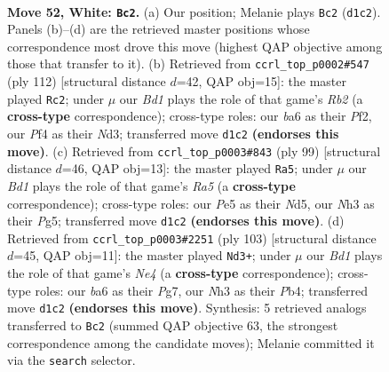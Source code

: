 \documentclass[11pt]{article}
\begin{document}
\clearpage

\begin{figure}[p]\centering
\begin{subfigure}{0.46\textwidth}\centering
\resizebox{\linewidth}{!}{%
\newchessgame
\chessboard[
  setfen={6k1/2r2p1p/b5p1/4Pp2/5P2/2n4N/P4KPP/3B4 w - - 12 52},
  showmover=false,
  pgfstyle=straightmove, color=movearrow, markmove={d1-c2}
]}
\caption{}
\end{subfigure}\hfill
\begin{subfigure}{0.46\textwidth}\centering
\resizebox{\linewidth}{!}{%
\newchessgame
\chessboard[
  setfen={8/2r1bpk1/4p1pp/8/2n4P/3NPBP1/1R3P1K/8 w - - 19 57},
  showmover=false,
  pgfstyle=straightmove, color=movearrow, markmove={b2-c2}
]}
\caption{}
\end{subfigure}
\\[4pt]
\begin{subfigure}{0.46\textwidth}\centering
\resizebox{\linewidth}{!}{%
\newchessgame
\chessboard[
  setfen={8/5pk1/4p2p/2Nn2p1/r7/5PP1/4PK1P/2R5 b - - 21 50},
  showmover=false,
  pgfstyle=straightmove, color=movearrow, markmove={a4-a5}
]}
\caption{}
\end{subfigure}\hfill
\begin{subfigure}{0.46\textwidth}\centering
\resizebox{\linewidth}{!}{%
\newchessgame
\chessboard[
  setfen={6k1/5pp1/4p2p/4n3/1p3P2/4P2P/1PN2KP1/8 b - - 0 52},
  showmover=false,
  pgfstyle=straightmove, color=movearrow, markmove={e5-d3}
]}
\caption{}
\end{subfigure}
\caption{\textbf{Move 52, White: \texttt{Bc2}.} (a) Our position; Melanie plays \texttt{Bc2} (\texttt{d1c2}). Panels (b)--(d) are the retrieved master positions whose correspondence most drove this move (highest QAP objective among those that transfer to it). (b) Retrieved from \texttt{ccrl\_top\_p0002\#547} (ply 112) [structural distance $d$=42, QAP obj=15]: the master played \texttt{Rc2}; under $\mu$ our \emph{Bd1} plays the role of that game's \emph{Rb2} (a \textbf{cross-type} correspondence); cross-type roles: our \emph{b}a6 as their \emph{P}f2, our \emph{P}f4 as their \emph{N}d3; transferred move \texttt{d1c2} \textbf{(endorses this move)}. (c) Retrieved from \texttt{ccrl\_top\_p0003\#843} (ply 99) [structural distance $d$=46, QAP obj=13]: the master played \texttt{Ra5}; under $\mu$ our \emph{Bd1} plays the role of that game's \emph{Ra5} (a \textbf{cross-type} correspondence); cross-type roles: our \emph{P}e5 as their \emph{N}d5, our \emph{N}h3 as their \emph{P}g5; transferred move \texttt{d1c2} \textbf{(endorses this move)}. (d) Retrieved from \texttt{ccrl\_top\_p0003\#2251} (ply 103) [structural distance $d$=45, QAP obj=11]: the master played \texttt{Nd3+}; under $\mu$ our \emph{Bd1} plays the role of that game's \emph{Ne4} (a \textbf{cross-type} correspondence); cross-type roles: our \emph{b}a6 as their \emph{P}g7, our \emph{N}h3 as their \emph{P}b4; transferred move \texttt{d1c2} \textbf{(endorses this move)}. Synthesis: 5 retrieved analogs transferred to \texttt{Bc2} (summed QAP objective 63, the strongest correspondence among the candidate moves); Melanie committed it via the \texttt{search} selector.}
\label{fig:thought-m102}
\end{figure}
\end{document}
